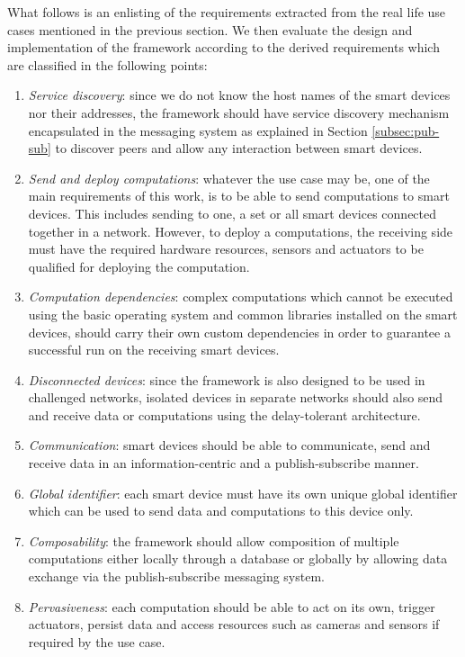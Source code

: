 What follows is an enlisting of  the requirements extracted from the real life use cases mentioned in the previous section. We then  evaluate the design and implementation of the framework according to the derived requirements which are  classified  in the following points:
\begin{enumerate}
\item \textit{Service discovery}: since we do not know the host names of the smart devices nor their addresses, the framework should have service discovery mechanism encapsulated in the messaging system as explained in Section \ref{subsec:pub-sub}  to discover peers and  allow any interaction between smart devices.
		
\item \textit{Send and deploy computations}: whatever the use case may be, one of the main requirements of this work, is to be able to send computations to smart devices. This includes sending to one, a set or all smart devices connected together in a network. However, to deploy a computations, the receiving side must have the required hardware resources, sensors and actuators to be qualified for deploying the computation.
 
 \item \textit{Computation dependencies}: complex computations which cannot be executed using the basic operating system and common libraries installed on the smart devices, should carry their  own custom dependencies in order to guarantee a successful run on the receiving smart devices. 


\item \textit{Disconnected devices}: since the framework is also designed to be used in challenged networks, isolated devices in separate networks should also send and receive data or computations using the delay-tolerant architecture.


\item \textit{Communication}: smart devices should be able to communicate, send and receive data in an information-centric and a publish-subscribe manner.

\item \textit{Global identifier}: each smart device must have its own unique global identifier which can be used to send data and computations to this device only.

\item \textit{Composability}: the framework should allow composition of multiple computations either locally through a database or globally by allowing data exchange via the publish-subscribe messaging system.

\item \textit{Pervasiveness}: each computation should be able to act on its own, trigger actuators, persist data and access resources such as cameras and sensors if required by the use case.
\end{enumerate}

